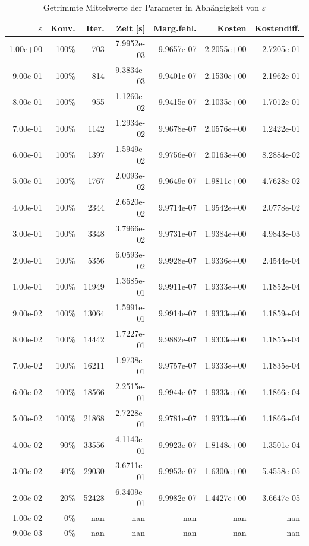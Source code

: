 \begin{table}[htbp]
\caption{Getrimmte Mittelwerte der Parameter in Abhängigkeit von $\varepsilon$}
\label{tab:Parametertest64_tol1e-06}
\small
\centering
{}
\begin{tabular}{rrrrrrr}
\toprule
$\varepsilon$ & Konv. & Iter. & Zeit [s] & Marg.fehl. & Kosten & Kostendiff. \\
\midrule
1.00e+00 & 100\% & 703 & 7.9952e-03 & 9.9657e-07 & 2.2055e+00 & 2.7205e-01 \\
9.00e-01 & 100\% & 814 & 9.3834e-03 & 9.9401e-07 & 2.1530e+00 & 2.1962e-01 \\
8.00e-01 & 100\% & 955 & 1.1260e-02 & 9.9415e-07 & 2.1035e+00 & 1.7012e-01 \\
7.00e-01 & 100\% & 1142 & 1.2934e-02 & 9.9678e-07 & 2.0576e+00 & 1.2422e-01 \\
6.00e-01 & 100\% & 1397 & 1.5949e-02 & 9.9756e-07 & 2.0163e+00 & 8.2884e-02 \\
5.00e-01 & 100\% & 1767 & 2.0093e-02 & 9.9649e-07 & 1.9811e+00 & 4.7628e-02 \\
4.00e-01 & 100\% & 2344 & 2.6520e-02 & 9.9714e-07 & 1.9542e+00 & 2.0778e-02 \\
3.00e-01 & 100\% & 3348 & 3.7966e-02 & 9.9731e-07 & 1.9384e+00 & 4.9843e-03 \\
2.00e-01 & 100\% & 5356 & 6.0593e-02 & 9.9928e-07 & 1.9336e+00 & 2.4544e-04 \\
1.00e-01 & 100\% & 11949 & 1.3685e-01 & 9.9911e-07 & 1.9333e+00 & 1.1852e-04 \\
9.00e-02 & 100\% & 13064 & 1.5991e-01 & 9.9914e-07 & 1.9333e+00 & 1.1859e-04 \\
8.00e-02 & 100\% & 14442 & 1.7227e-01 & 9.9882e-07 & 1.9333e+00 & 1.1855e-04 \\
7.00e-02 & 100\% & 16211 & 1.9738e-01 & 9.9757e-07 & 1.9333e+00 & 1.1835e-04 \\
6.00e-02 & 100\% & 18566 & 2.2515e-01 & 9.9944e-07 & 1.9333e+00 & 1.1866e-04 \\
5.00e-02 & 100\% & 21868 & 2.7228e-01 & 9.9781e-07 & 1.9333e+00 & 1.1866e-04 \\
4.00e-02 & 90\% & 33556 & 4.1143e-01 & 9.9923e-07 & 1.8148e+00 & 1.3501e-04 \\
3.00e-02 & 40\% & 29030 & 3.6711e-01 & 9.9953e-07 & 1.6300e+00 & 5.4558e-05 \\
2.00e-02 & 20\% & 52428 & 6.3409e-01 & 9.9982e-07 & 1.4427e+00 & 3.6647e-05 \\
1.00e-02 & 0\% & nan & nan & nan & nan & nan \\
9.00e-03 & 0\% & nan & nan & nan & nan & nan \\
\bottomrule
\end{tabular}
\end{table}
